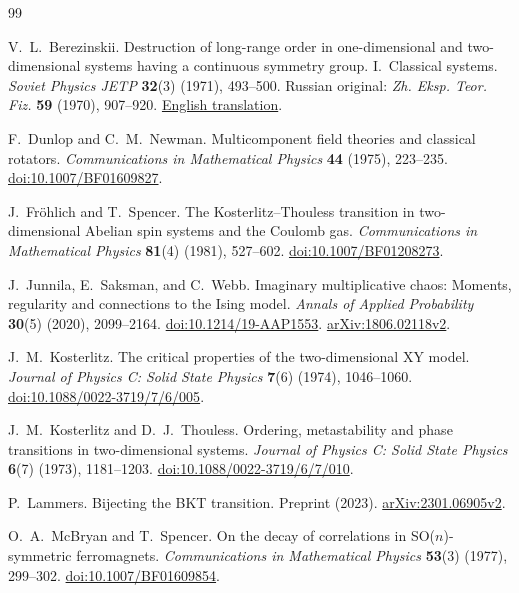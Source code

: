 \begin{thebibliography}{99}
\raggedright

V.~L.~Berezinskii.
Destruction of long-range order in one-dimensional and two-dimensional
systems having a continuous symmetry group. I.~Classical systems.
\emph{Soviet Physics JETP} \textbf{32}(3) (1971), 493--500.
Russian original: \emph{Zh. Eksp. Teor. Fiz.} \textbf{59}
(1970), 907--920.
\href{https://www.jetp.ras.ru/cgi-bin/dn/e_032_03_0493.pdf}
{English translation}.

F.~Dunlop and C.~M.~Newman.
Multicomponent field theories and classical rotators.
\emph{Communications in Mathematical Physics}
\textbf{44} (1975), 223--235.
\href{https://doi.org/10.1007/BF01609827}
{doi:10.1007/BF01609827}.

J.~Fr\"ohlich and T.~Spencer.
The Kosterlitz--Thouless transition in two-dimensional Abelian
spin systems and the Coulomb gas.
\emph{Communications in Mathematical Physics}
\textbf{81}(4) (1981), 527--602.
\href{https://doi.org/10.1007/BF01208273}
{doi:10.1007/BF01208273}.

J.~Junnila, E.~Saksman, and C.~Webb.
Imaginary multiplicative chaos: Moments, regularity and connections
to the Ising model.
\emph{Annals of Applied Probability}
\textbf{30}(5) (2020), 2099--2164.
\href{https://doi.org/10.1214/19-AAP1553}
{doi:10.1214/19-AAP1553}.
\href{https://arxiv.org/abs/1806.02118v2}{arXiv:1806.02118v2}.

J.~M.~Kosterlitz.
The critical properties of the two-dimensional XY model.
\emph{Journal of Physics C: Solid State Physics}
\textbf{7}(6) (1974), 1046--1060.
\href{https://doi.org/10.1088/0022-3719/7/6/005}
{doi:10.1088/0022-3719/7/6/005}.

J.~M.~Kosterlitz and D.~J.~Thouless.
Ordering, metastability and phase transitions in two-dimensional systems.
\emph{Journal of Physics C: Solid State Physics}
\textbf{6}(7) (1973), 1181--1203.
\href{https://doi.org/10.1088/0022-3719/6/7/010}
{doi:10.1088/0022-3719/6/7/010}.

P.~Lammers.
Bijecting the BKT transition.
Preprint (2023).
\href{https://arxiv.org/abs/2301.06905v2}{arXiv:2301.06905v2}.

O.~A.~McBryan and T.~Spencer.
On the decay of correlations in SO($n$)-symmetric ferromagnets.
\emph{Communications in Mathematical Physics}
\textbf{53}(3) (1977), 299--302.
\href{https://doi.org/10.1007/BF01609854}
{doi:10.1007/BF01609854}.


\end{thebibliography}

